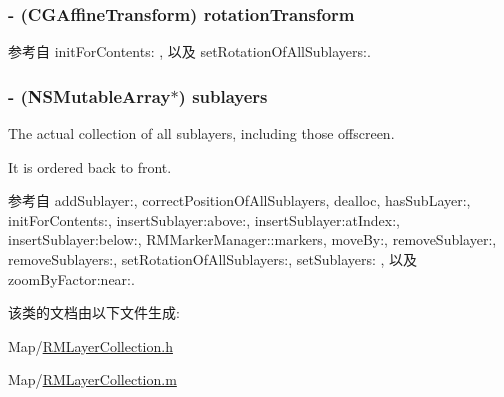 \hypertarget{interface_r_m_layer_collection_a4586e34b2b33538246475b41e17d8534}{
\subsubsection[{rotation\-Transform}]{\setlength{\rightskip}{0pt plus 5cm}-\/ (C\-G\-Affine\-Transform) rotation\-Transform\hspace{0.3cm}{\ttfamily [protected]}}}\label{interface_r_m_layer_collection_a4586e34b2b33538246475b41e17d8534}


参考自 init\-For\-Contents\-: , 以及 set\-Rotation\-Of\-All\-Sublayers\-:.

\hypertarget{interface_r_m_layer_collection_ae0741a32da2070098e364aac1c181256}{
\subsubsection[{sublayers}]{\setlength{\rightskip}{0pt plus 5cm}-\/ (N\-S\-Mutable\-Array$\ast$) sublayers\hspace{0.3cm}{\ttfamily [protected]}}}\label{interface_r_m_layer_collection_ae0741a32da2070098e364aac1c181256}


The actual collection of all sublayers, including those offscreen. 

It is ordered back to front. 

参考自 add\-Sublayer\-:, correct\-Position\-Of\-All\-Sublayers, dealloc, has\-Sub\-Layer\-:, init\-For\-Contents\-:, insert\-Sublayer\-:above\-:, insert\-Sublayer\-:at\-Index\-:, insert\-Sublayer\-:below\-:, R\-M\-Marker\-Manager\-::markers, move\-By\-:, remove\-Sublayer\-:, remove\-Sublayers\-:, set\-Rotation\-Of\-All\-Sublayers\-:, set\-Sublayers\-: , 以及 zoom\-By\-Factor\-:near\-:.



该类的文档由以下文件生成\-:\begin{DoxyCompactItemize}
\item 
Map/\hyperlink{_r_m_layer_collection_8h}{R\-M\-Layer\-Collection.\-h}\item 
Map/\hyperlink{_r_m_layer_collection_8m}{R\-M\-Layer\-Collection.\-m}\end{DoxyCompactItemize}
